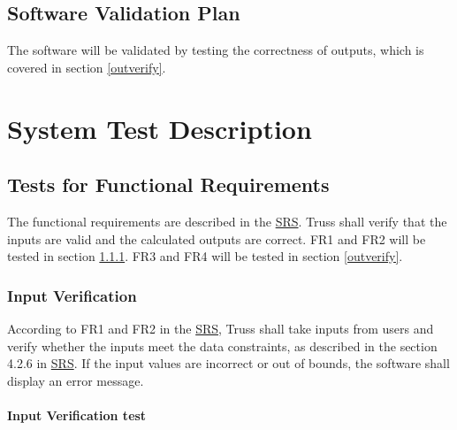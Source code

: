 \documentclass[12pt, titlepage]{article}
\begin{document}
\subsection{Software Validation Plan} \label{sftwareplan}
The software will be validated by testing the correctness of outputs, which is 
covered in section \ref{outverify}.

\section{System Test Description} \label{sysdescript}
	
\subsection{Tests for Functional Requirements} \label{testfr}
The functional requirements are described in the 
\href{https://github.com/tingyuw/cas741/blob/master/docs/SRS/SRS.pdf}{SRS}. 
Truss shall verify that the inputs are valid and the calculated outputs are 
correct. FR1 and FR2 will be tested in section \ref{inverify}. FR3 and FR4 will 
be tested in section \ref{outverify}.

\subsubsection{Input Verification} \label{inverify}
According to FR1 and FR2 in the 
\href{https://github.com/tingyuw/cas741/blob/master/docs/SRS/SRS.pdf}{SRS}, 
Truss shall take inputs from users and verify whether the inputs meet the data 
constraints, as described in the section 4.2.6 in 
\href{https://github.com/tingyuw/cas741/blob/master/docs/SRS/SRS.pdf}{SRS}. If 
the input values are incorrect or out of bounds, the software shall display an 
error message.
		
\paragraph{Input Verification test}
\end{document}
